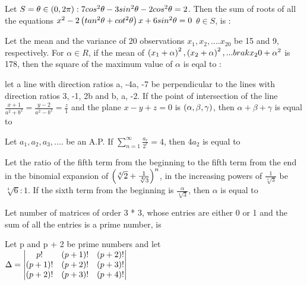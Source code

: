 \iffalse
\title{2022}
\author{AI24BTECH11013}
\section{subjective}
\fi
\item Let $S = \theta \in \left(0,2\pi\right) : 7 cos^2\theta - 3 sin^2 \theta - 2 cos^2\theta = 2$. Then the sum of roots of all the equations $x^2 - 2 \left(tan^2\theta + cot^2\theta\right) x + 6 sin^2\theta = 0 $ $\theta \in S$, is :
\hfill{}
\item Let the mean and the variance of 20 observations $x_1,x_2,....x_20$ be 15 and 9, respectively. For $\alpha \in R$, if the mean of $\left(x_1 + \alpha\right)^2,\left(x_2 + \alpha\right)^2,...brak{x_20 + \alpha}^2$ is 178, then the square of the maximum value of $\alpha$ is eqal to :
\hfill{}
\item let a line with direction ratios a, -4a, -7 be perpendicular to the lines with direction ratios 3, -1, 2b and b, a, -2. If the point of intersection of the line $\frac{x + 1}{a^2 +b^2} = \frac{y - 2}{a^2 - b^2} = \frac{z}{1}$ and the plane $x - y + z = 0$ is $\left(\alpha, \beta, \gamma\right)$, then $\alpha + \beta + \gamma$ is equal to 
\hfill{}
\item Let $a_1, a_2, a_3,....$ be an A.P. If $\sum_{n=1}^{\infty} \frac{a_r}{2^r}=4$, then $4a_2$ is equal to 
\hfill{}
\item Let the ratio of the fifth term from the beginning to the fifth term from the end in the binomial expansion of $\left(\sqrt[4]{2}+\frac{1}{\sqrt[4]{3}}\right)^n$, in the increasing powers of $\frac{1}{\sqrt[4]{3}}$ be $\sqrt[4]{6} : 1$. If the sixth term from the beginning is $\frac{\alpha}{\sqrt[4]{3}}$, then $\alpha$ is equal to 
\hfill{}
\item Let number of matrices of order 3 * 3, whose entries are either 0 or 1 and the sum of all the entries is a prime number, is 
\hfill{}
\item Let p and p + 2 be prime numbers and let \\
$\Delta = 
\begin{vmatrix}
p! & \left(p+1\right)! & \left(p+2\right)! \\
\left(p+1\right)! & \left(p+2\right)! & \left(p+3\right)! \\
\left(p+2\right)! & \left(p+3\right)! & \left(p+4\right)!
\end{vmatrix}$

